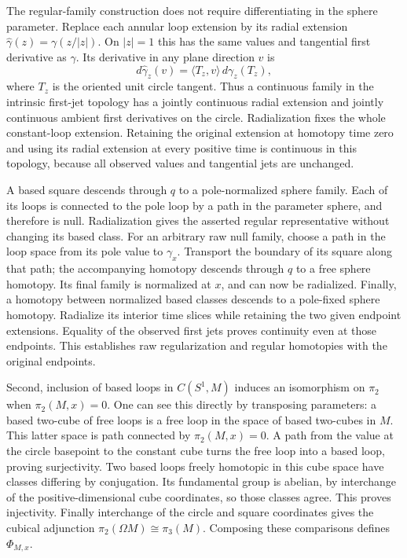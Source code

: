 The regular-family construction does not require differentiating in
the sphere parameter. Replace each annular loop extension by its
radial extension $\widehat\gamma(z)=\gamma(z/|z|)$. On $|z|=1$ this
has the same values and tangential first derivative as $\gamma$.
Its derivative in any plane direction $v$ is
\[
 d\widehat\gamma_z(v)=
 \langle T_z,v\rangle\,d\gamma_z(T_z),
\]
where $T_z$ is the oriented unit circle tangent. Thus a continuous
family in the intrinsic first-jet topology has a jointly continuous
radial extension and jointly continuous ambient first derivatives
on the circle. Radialization fixes the whole constant-loop
extension. Retaining the original extension at homotopy time zero
and using its radial extension at every positive time is continuous
in this topology, because all observed values and tangential jets
are unchanged.

A based square descends through $q$ to a pole-normalized sphere
family. Each of its loops is connected to the pole loop by a path
in the parameter sphere, and therefore is null. Radialization gives
the asserted regular representative without changing its based
class. For an arbitrary raw null family, choose a path in the loop
space from its pole value to $\gamma_x$. Transport the boundary of
its square along that path; the accompanying homotopy descends
through $q$ to a free sphere homotopy. Its final family is normalized
at $x$, and can now be radialized. Finally, a homotopy between
normalized based classes descends to a pole-fixed sphere homotopy.
Radialize its interior time slices while retaining the two given
endpoint extensions. Equality of the observed first jets proves
continuity even at those endpoints. This establishes raw
regularization and regular homotopies with the original endpoints.

Second, inclusion of based loops in $C(S^1,M)$ induces an isomorphism on
$\pi_2$ when $\pi_2(M,x)=0$. One can see this directly by transposing
parameters: a based two-cube of free loops is a free loop in the space
of based two-cubes in $M$. This latter space is path connected by
$\pi_2(M,x)=0$. A path from the value at the circle basepoint to the
constant cube turns the free loop into a based loop, proving
surjectivity. Two based loops freely homotopic in this cube space have
classes differing by conjugation. Its fundamental group is abelian,
by interchange of the positive-dimensional cube coordinates, so those
classes agree. This proves injectivity. Finally interchange of the
circle and square coordinates gives the cubical adjunction
$\pi_2(\Omega M)\cong\pi_3(M)$. Composing these comparisons defines
$\Phi_{M,x}$.


